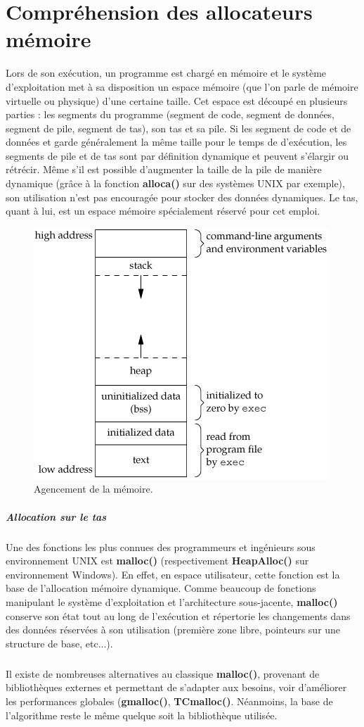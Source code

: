 \section{Compréhension des allocateurs mémoire}
Lors de son exécution, un programme est chargé en mémoire et le système d'exploitation
met à sa disposition un espace mémoire (que l'on parle de mémoire virtuelle ou physique)
d'une certaine taille. Cet espace est découpé en plusieurs parties : les segments du programme
(segment de code, segment de données, segment de pile, segment de tas), son tas et sa pile. Si les segment de code et de
données et garde généralement la même taille pour le temps de d'exécution, les segments de pile et de tas sont par définition
dynamique et peuvent s'élargir ou rétrécir. Même s'il est possible d'augmenter la taille de la pile de manière dynamique (grâce
à la fonction \textbf{alloca()} sur des systèmes UNIX par exemple), son utilisation n'est pas encouragée pour stocker des données
dynamiques. Le tas, quant à lui, est un espace mémoire spécialement réservé pour cet emploi.
\begin{figure}[h]
    \centering
    \includegraphics[scale=0.4]{memory-layout.png}\newline
    \caption{Agencement de la mémoire.}
\end{figure}


\subparagraph{Allocation sur le tas}
Une des fonctions les plus connues des programmeurs et ingénieurs sous environnement UNIX est \textbf{malloc()} (respectivement \textbf{HeapAlloc()} sur
environnement Windows). En effet, en espace utilisateur, cette fonction est la base de l'allocation mémoire dynamique. Comme beaucoup de fonctions
manipulant le système d'exploitation et l'architecture sous-jacente, \textbf{malloc()} conserve son état tout au long de l'exécution et répertorie les
changements dans des données réservées à son utilisation (première zone libre, pointeurs sur une structure de base, etc...).
\subparagraph{}
Il existe de nombreuses alternatives au classique \textbf{malloc()}, provenant de bibliothèques externes et permettant de s'adapter aux besoins, voir d'améliorer les
performances globales (\textbf{gmalloc()}, \textbf{TCmalloc()}. Néanmoins, la base de l'algorithme reste le même quelque soit la bibliothèque utilisée.

